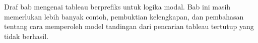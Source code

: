 \documentclass[../../../include/open-logic-chapter]{subfiles}
\begin{document}

\begin{editorial}
  Draf bab mengenai tableau berprefiks untuk logika modal. Bab ini masih
  memerlukan lebih banyak contoh, pembuktian kelengkapan, dan pembahasan
  tentang cara memperoleh model tandingan dari pencarian tableau tertutup
  yang tidak berhasil.
\end{editorial}


\OLEndChapterHook
\end{document}
